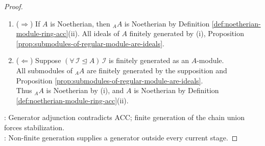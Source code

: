 \begin{theorem}
\begin{proof}
\begin{enumerate}[label=(\roman*)]
Hence $U\leq M$ by Theorem \ref{thm:submodule-test}. Fix $r\in\N$ and $(u_1,\ldots,u_r)\in U^r$ satisfying $U=\langle\!\langle u_1,\ldots,u_r\rangle\!\rangle_A$ by finite generation of $U$.\\
Fix $(k_1,\ldots,k_r)\in\N^r$ satisfying $(\forall\,j\in\{1,\ldots,r\})\,u_j\in M_{k_j}$. Set $k\defeq\max\{k_1,\ldots,k_r\}$. Then $U\subseteq M_k$ by Proposition \ref{prop:generated-submodule-smallest}(iii).\\
$M_k\subseteq U$ by construction. $(\forall\,n\in\N)\,[n\geq k\Rightarrow M_n=M_k]$ by $M_k\subseteq M_n\subseteq U\subseteq M_k$. Hence $M$ is Noetherian by Definition \ref{def:noetherian-module-ring-acc}(i).
\item[$(ii)$] ($\Rightarrow$) If $A$ is Noetherian, then ${}_A A$ is Noetherian by Definition \ref{def:noetherian-module-ring-acc}(ii). All ideals of $A$ finitely generated by (i), Proposition \ref{prop:submodules-of-regular-module-are-ideals}.
\item[$(ii)$] ($\Leftarrow$) Suppose $(\forall\,\mathcal{I}\trianglelefteq A)\,\mathcal{I}$ is finitely generated as an $A$-module.\\
All submodules of ${}_A A$ are finitely generated by the supposition and Proposition \ref{prop:submodules-of-regular-module-are-ideals}.\\
Thus ${}_A A$ is Noetherian by (i), and $A$ is Noetherian by Definition \ref{def:noetherian-module-ring-acc}(ii).
\end{enumerate}
: Generator adjunction contradicts ACC; finite generation of the chain union forces stabilization.\\
: Non-finite generation supplies a generator outside every current stage.
\end{proof}
\end{theorem}
